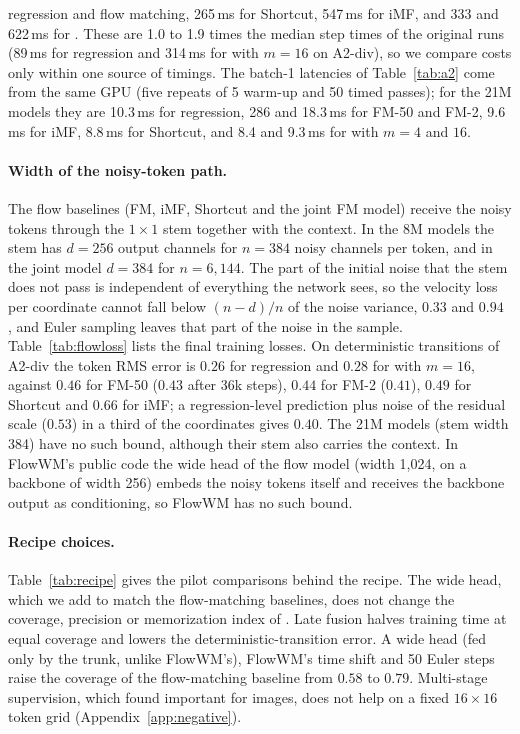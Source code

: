 regression and flow matching, 265\,ms for Shortcut, 547\,ms for iMF, and 333 and 622\,ms for \imlewm{}. These are 1.0 to 1.9 times the median step times of the original runs (89\,ms for regression and 314\,ms for \imlewm{} with $m{=}16$ on A2-div), so we compare costs only within one source of timings. The batch-1 latencies of Table~\ref{tab:a2} come from the same GPU (five repeats of 5 warm-up and 50 timed passes); for the 21M models they are 10.3\,ms for regression, 286 and 18.3\,ms for FM-50 and FM-2, 9.6\,ms for iMF, 8.8\,ms for Shortcut, and 8.4 and 9.3\,ms for \imlewm{} with $m = 4$ and $16$.

\paragraph{Width of the noisy-token path.}
The flow baselines (FM, iMF, Shortcut and the joint FM model) receive the noisy tokens through the $1\times1$ stem together with the context. In the 8M models the stem has $d = 256$ output channels for $n = 384$ noisy channels per token, and in the joint model $d = 384$ for $n = 6{,}144$. The part of the initial noise that the stem does not pass is independent of everything the network sees, so the velocity loss per coordinate cannot fall below $(n - d)/n$ of the noise variance, $0.33$ and $0.94$ \citep[Theorem~1]{zheng2025rae}, and Euler sampling leaves that part of the noise in the sample. Table~\ref{tab:flowloss} lists the final training losses. On deterministic transitions of A2-div the token RMS error is $0.26$ for regression and $0.28$ for \imlewm{} with $m{=}16$, against $0.46$ for FM-50 ($0.43$ after 36k steps), $0.44$ for FM-2 ($0.41$), $0.49$ for Shortcut and $0.66$ for iMF; a regression-level prediction plus noise of the residual scale ($0.53$) in a third of the coordinates gives $0.40$. The 21M models (stem width 384) have no such bound, although their stem also carries the context. In FlowWM's public code the wide head of the flow model (width 1{,}024, on a backbone of width 256) embeds the noisy tokens itself and receives the backbone output as conditioning, so FlowWM has no such bound.

\paragraph{Recipe choices.}
Table~\ref{tab:recipe} gives the pilot comparisons behind the recipe. The wide head, which we add to match the flow-matching baselines, does not change the coverage, precision or memorization index of \imlewm{}. Late fusion halves training time at equal coverage and lowers the deterministic-transition error. A wide head (fed only by the trunk, unlike FlowWM's), FlowWM's time shift and 50 Euler steps raise the coverage of the flow-matching baseline from $0.58$ to $0.79$. Multi-stage supervision, which \citet{vashist2026roms} found important for images, does not help on a fixed $16\times16$ token grid (Appendix~\ref{app:negative}).

